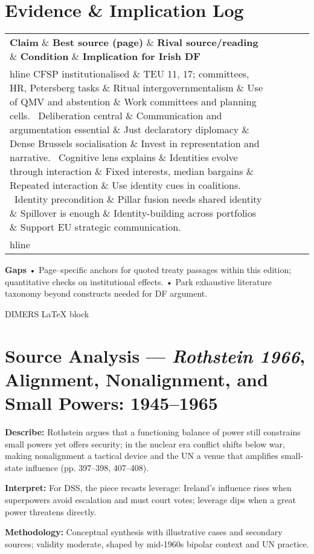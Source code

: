 \section*{Evidence \& Implication Log}
\begin{tabular}{p{3.2cm}p{4.2cm}p{3.6cm}p{3.2cm}p{4.2cm}}
	\textbf{Claim} \& \textbf{Best source (page)} \& \textbf{Rival source/reading} \& \textbf{Condition} \& \textbf{Implication for Irish DF}\\hline
	CFSP institutionalised \& TEU 11, 17; committees, HR, Petersberg tasks \& Ritual intergovernmentalism \& Use of QMV and abstention \& Work committees and planning cells. \
	Deliberation central \& Communication and argumentation essential \& Just declaratory diplomacy \& Dense Brussels socialisation \& Invest in representation and narrative. \
	Cognitive lens explains \& Identities evolve through interaction \& Fixed interests, median bargains \& Repeated interaction \& Use identity cues in coalitions. \
	Identity precondition \& Pillar fusion needs shared identity \& Spillover is enough \& Identity-building across portfolios \& Support EU strategic communication. \\hline
\end{tabular}

\textbf{Gaps}
• Page–specific anchors for quoted treaty passages within this edition; quantitative checks on institutional effects.
• Park exhaustive literature taxonomy beyond constructs needed for DF argument.

\parencite{ROTHSTEIN_1966}

DIMERS LaTeX block

\section*{Source Analysis — \textit{Rothstein 1966}, Alignment, Nonalignment, and Small Powers: 1945–1965}
\textbf{Describe:} Rothstein argues that a functioning balance of power still constrains small powers yet offers security; in the nuclear era conflict shifts below war, making nonalignment a tactical device and the UN a venue that amplifies small-state influence (pp. 397–398, 407–408).

\textbf{Interpret:} For DSS, the piece recasts leverage: Ireland’s influence rises when superpowers avoid escalation and must court votes; leverage dips when a great power threatens directly.

\textbf{Methodology:} Conceptual synthesis with illustrative cases and secondary sources; validity moderate, shaped by mid-1960s bipolar context and UN practice.

